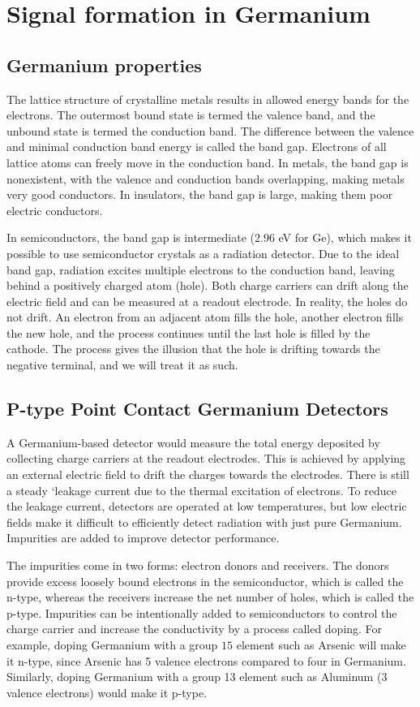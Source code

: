 \section{Signal formation in Germanium}
\subsection{Germanium properties}
The lattice structure of crystalline metals results in allowed energy bands for the electrons. The outermost bound state is termed the valence band, and the unbound state is termed the conduction band. The difference between the valence and minimal conduction band energy is called the band gap. Electrons of all lattice atoms can freely move in the conduction band. In metals, the band gap is nonexistent, with the valence and conduction bands overlapping, making metals very good conductors. In insulators, the band gap is large, making them poor electric conductors.

In semiconductors, the band gap is intermediate ($2.96$ eV for Ge), which makes it possible to use semiconductor crystals as a radiation detector. Due to the ideal band gap, radiation excites multiple electrons to the conduction band, leaving behind a positively charged atom (hole). Both charge carriers can drift along the electric field and can be measured at a readout electrode. In reality, the holes do not drift. An electron from an adjacent atom fills the hole, another electron fills the new hole, and the process continues until the last hole is filled by the cathode. The process gives the illusion that the hole is drifting towards the negative terminal, and we will treat it as such.

\subsection{P-type Point Contact Germanium Detectors}
A Germanium-based detector would measure the total energy deposited by collecting charge carriers at the readout electrodes. This is achieved by applying an external electric field to drift the charges towards the electrodes. There is still a steady `leakage current due to the thermal excitation of electrons. To reduce the leakage current, detectors are operated at low temperatures, but low electric fields make it difficult to efficiently detect radiation with just pure Germanium. Impurities are added to improve detector performance.

The impurities come in two forms: electron donors and receivers. The donors provide excess loosely bound electrons in the semiconductor, which is called the n-type, whereas the receivers increase the net number of holes, which is called the p-type. Impurities can be intentionally added to semiconductors to control the charge carrier and increase the conductivity by a process called doping. For example, doping Germanium with a group $15$ element such as Arsenic will make it n-type, since Arsenic has 5 valence electrons compared to four in Germanium. Similarly, doping Germanium with a group 13 element such as Aluminum (3 valence electrons) would make it p-type.

